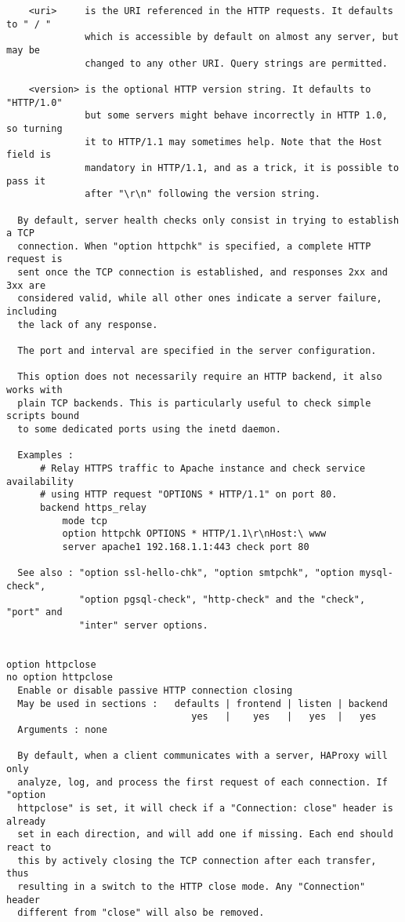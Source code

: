 \begin{verbatim}
    <uri>     is the URI referenced in the HTTP requests. It defaults to " / "
              which is accessible by default on almost any server, but may be
              changed to any other URI. Query strings are permitted.

    <version> is the optional HTTP version string. It defaults to "HTTP/1.0"
              but some servers might behave incorrectly in HTTP 1.0, so turning
              it to HTTP/1.1 may sometimes help. Note that the Host field is
              mandatory in HTTP/1.1, and as a trick, it is possible to pass it
              after "\r\n" following the version string.

  By default, server health checks only consist in trying to establish a TCP
  connection. When "option httpchk" is specified, a complete HTTP request is
  sent once the TCP connection is established, and responses 2xx and 3xx are
  considered valid, while all other ones indicate a server failure, including
  the lack of any response.

  The port and interval are specified in the server configuration.

  This option does not necessarily require an HTTP backend, it also works with
  plain TCP backends. This is particularly useful to check simple scripts bound
  to some dedicated ports using the inetd daemon.

  Examples :
      # Relay HTTPS traffic to Apache instance and check service availability
      # using HTTP request "OPTIONS * HTTP/1.1" on port 80.
      backend https_relay
          mode tcp
          option httpchk OPTIONS * HTTP/1.1\r\nHost:\ www
          server apache1 192.168.1.1:443 check port 80

  See also : "option ssl-hello-chk", "option smtpchk", "option mysql-check",
             "option pgsql-check", "http-check" and the "check", "port" and
             "inter" server options.


option httpclose
no option httpclose
  Enable or disable passive HTTP connection closing
  May be used in sections :   defaults | frontend | listen | backend
                                 yes   |    yes   |   yes  |   yes
  Arguments : none

  By default, when a client communicates with a server, HAProxy will only
  analyze, log, and process the first request of each connection. If "option
  httpclose" is set, it will check if a "Connection: close" header is already
  set in each direction, and will add one if missing. Each end should react to
  this by actively closing the TCP connection after each transfer, thus
  resulting in a switch to the HTTP close mode. Any "Connection" header
  different from "close" will also be removed.


\end{verbatim}
